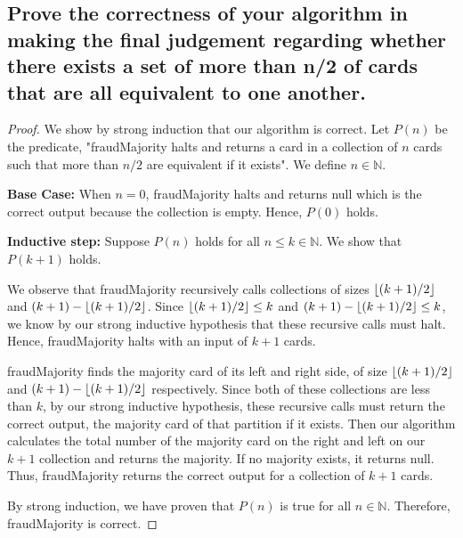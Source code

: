 \documentclass[11pt]{scrartcl}
\begin{document}
\subsection{
	Prove the correctness of your algorithm in making the final judgement regarding
	whether there exists a set of more than n/2 of cards that are all equivalent to one
	another.
}
\begin{proof}
	We show by strong induction that our algorithm is correct. Let $P(n)$ be the predicate,
	"fraudMajority halts and returns a card in a collection of $n$ cards
	such that more than $n/2$ are equivalent if it exists". We define $n \in \mathbb{N}$.
	\par \textbf{Base Case:} When $n = 0$, fraudMajority halts and returns null which is the correct output
	because the collection is empty. Hence, $P(0)$ holds.
	\par \textbf{Inductive step:} Suppose $P(n)$ holds for all $n \leq k \in \mathbb{N}$. We show that $P(k+1)$ holds.
	\par We observe that fraudMajority recursively calls collections of sizes $\left\lfloor (k+1)/2 \right\rfloor$ and
	$(k+1) - \left\lfloor (k+1)/2 \right\rfloor$.
	Since $\left\lfloor (k+1)/2 \right\rfloor \leq k$ and $(k+1) - \left\lfloor (k+1)/2 \right\rfloor \leq k $, we know by our strong inductive hypothesis that these
	recursive calls must halt. Hence, fraudMajority halts with an input of $k+1$ cards.
	\par fraudMajority finds the majority card of its left and right side, of size $\left\lfloor (k+1)/2 \right\rfloor$ and
	$(k+1) - \left\lfloor (k+1)/2 \right\rfloor$ respectively. Since both of these collections are less than $k$, by our strong inductive hypothesis,
	these recursive calls must return the correct output, the majority card of that partition if it exists.
	Then our algorithm calculates the total number of the majority card on the right and left on our
	$k+1$ collection and returns the majority. If no majority exists, it returns null. Thus,
	fraudMajority returns the correct output for a collection of $k+1$ cards.

	\par By strong induction, we have proven that $P(n)$ is true for all $n \in \mathbb{N}$.
	Therefore, fraudMajority is correct.
\end{proof}


\end{document}
